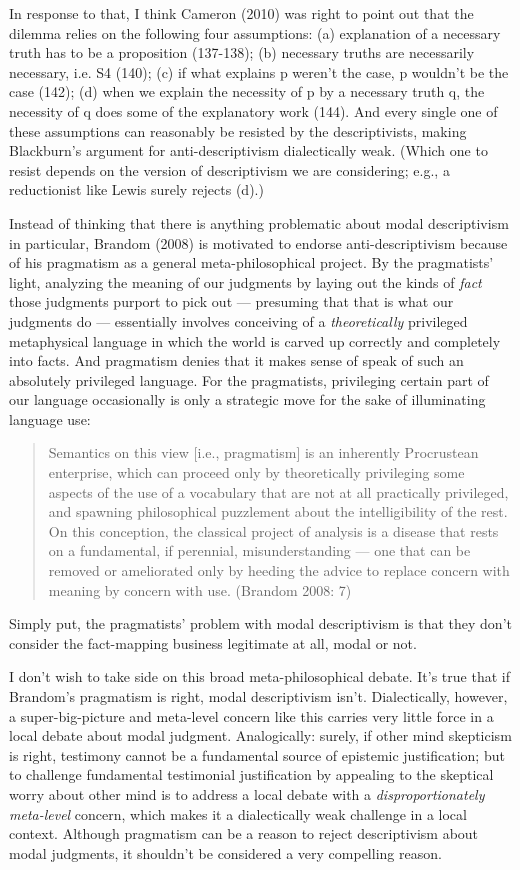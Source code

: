 \documentclass[a4paper,12pt]{article}
\begin{document}
In response to that, I think Cameron (2010) was right to point out that the dilemma relies on the following four assumptions: (a) explanation of a necessary truth has to be a proposition (137-138); (b) necessary truths are necessarily necessary, i.e. S4 (140); (c) if what explains p weren't the case, p wouldn't be the case (142); (d) when we explain the necessity of p by a necessary truth q, the necessity of q does some of the explanatory work (144). And every single one of these assumptions can reasonably be resisted by the descriptivists, making Blackburn's argument for anti-descriptivism dialectically weak. (Which one to resist depends on the version of descriptivism we are considering; e.g., a reductionist like Lewis surely rejects (d).)

Instead of thinking that there is anything problematic about modal descriptivism in particular, Brandom (2008) is motivated to endorse anti-descriptivism because of his pragmatism as a general meta-philosophical project. By the pragmatists' light, analyzing the meaning of our judgments by laying out the kinds of \emph{fact} those judgments purport to pick out --- presuming that that is what our judgments do --- essentially involves conceiving of a \emph{theoretically} privileged metaphysical language in which the world is carved up correctly and completely into facts. And pragmatism denies that it makes sense of speak of such an absolutely privileged language. For the pragmatists, privileging certain part of our language occasionally is only a strategic move for the sake of illuminating language use:

\begin{quote}
Semantics on this view [i.e., pragmatism] is an inherently Procrustean enterprise, which can proceed only by theoretically privileging some aspects of the use of a vocabulary that are not at all practically privileged, and spawning philosophical puzzlement about the intelligibility of the rest. On this conception, the classical project of analysis is a disease that rests on a fundamental, if perennial, misunderstanding --- one that can be removed or ameliorated only by heeding the advice to replace concern with meaning by concern with use. (Brandom 2008: 7)
\end{quote}

Simply put, the pragmatists' problem with modal descriptivism is that they don't consider the fact-mapping business legitimate at all, modal or not.

I don't wish to take side on this broad meta-philosophical debate. It's true that if Brandom's pragmatism is right, modal descriptivism isn't. Dialectically, however, a super-big-picture and meta-level concern like this carries very little force in a local debate about modal judgment. Analogically: surely, if other mind skepticism is right, testimony cannot be a fundamental source of epistemic justification; but to challenge fundamental testimonial justification by appealing to the skeptical worry about other mind is to address a local debate with a \emph{disproportionately meta-level} concern, which makes it a dialectically weak challenge in a local context. Although pragmatism can be a reason to reject descriptivism about modal judgments, it shouldn't be considered a very compelling reason.
\end{document}
